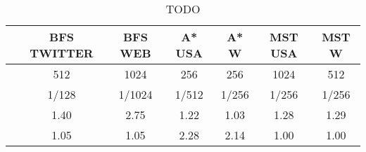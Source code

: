 \begin{table}[h]
\centring
\begin{tabular}{ |c|c|c|c|c|c|c| }
\hline
 & \large{\textbf{BFS TWITTER}} & \large{\textbf{BFS WEB}} & \large{\textbf{A* USA}} & \large{\textbf{A* W}} & \large{\textbf{MST USA}} & \large{\textbf{MST W}} \\
\hline
\insbatch{} & 512 & 1024 & 256 & 256 & 1024 & 512 \\
\hline
\delprob{} & 1/128 & 1/1024 & 1/512 & 1/256 & 1/256 & 1/256 \\
\hline
\speed{} & 1.40 & 2.75 & 1.22 & 1.03 & 1.28 & 1.29 \\
\hline
\workinc{} & 1.05 & 1.05 & 2.28 & 2.14 & 1.00 & 1.00 \\
\hline
\end{tabular}
\vspace{0.3em}
\caption{TODO }
\label{table:todo}
\end{table}
